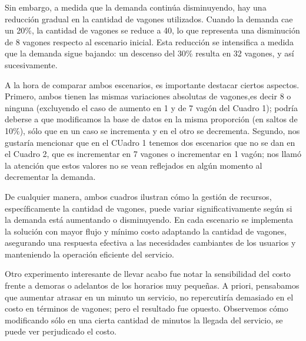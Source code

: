\documentclass{article}
\begin{document}
        Sin embargo, a medida que la demanda continúa disminuyendo, hay una reducción gradual en la cantidad de vagones utilizados. Cuando la demanda cae un 20\%, la cantidad de vagones se reduce a 40, lo que representa una disminución de 8 vagones respecto al escenario inicial. Esta reducción se intensifica a medida que la demanda sigue bajando: un descenso del 30\% resulta en 32 vagones, y así sucesivamente.

        A la hora de comparar ambos escenarios, es importante destacar ciertos aspectos. Primero, ambos tienen las mismas variaciones absolutas de vagones,es decir 8 o ninguna (excluyendo el caso de aumento en 1 y de 7 vagón del Cuadro 1); podría deberse a que modificamos la base de datos en la misma proporción (en saltos de 10\%), sólo que en un caso se incrementa y en el otro se decrementa. Segundo, nos gustaría mencionar que en el CUadro 1 tenemos dos escenarios que no se dan en el Cuadro 2, que es incrementar en 7 vagones o incrementar en 1 vagón; nos llamó la atención que estos valores no se vean reflejados en algún momento al decrementar la demanda.

        De cualquier manera, ambos cuadros ilustran cómo la gestión de recursos, específicamente la cantidad de vagones, puede variar significativamente según si la demanda está aumentando o disminuyendo. En cada escenario se implementa la solución con mayor flujo y mínimo costo adaptando la cantidad de vagones, asegurando una respuesta efectiva a las necesidades cambiantes de los usuarios y manteniendo la operación eficiente del servicio.

    Otro experimento interesante de llevar acabo fue notar la sensibilidad del costo frente a demoras o adelantos de los horarios muy pequeñas. A priori, pensabamos que aumentar atrasar en un minuto un servicio, no repercutiría demasiado en el costo en términos de vagones; pero el resultado fue opuesto. Observemos cómo modificando sólo en una cierta cantidad de minutos la llegada del servicio, se puede ver perjudicado el costo. 
\end{document}
